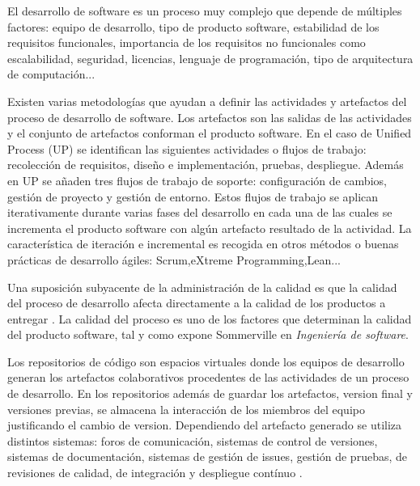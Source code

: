 

El desarrollo de software es un proceso muy complejo que depende de múltiples factores: equipo de desarrollo, tipo de producto software, estabilidad de los requisitos funcionales, importancia de los requisitos no funcionales como escalabilidad, seguridad, licencias, lenguaje de programación, tipo de arquitectura de computación...

Existen varias metodologías que ayudan a definir las actividades y artefactos del proceso de desarrollo de software. Los artefactos son las salidas de las actividades y el conjunto de artefactos conforman el producto software. En el caso de  Unified Process (UP) \cite{jacobson_proceso_2000} se identifican las siguientes actividades o flujos de trabajo: recolección de requisitos, diseño e implementación, pruebas, despliegue. Además en UP se añaden tres flujos de trabajo de soporte: configuración de cambios, gestión de proyecto y gestión de entorno. Estos flujos de trabajo se aplican iterativamente durante varias fases del desarrollo en cada una de las cuales se incrementa el producto software con algún artefacto resultado de la actividad. La característica de iteración e incremental es recogida en otros métodos o buenas prácticas de desarrollo ágiles\cite{noauthor_scrum_2019}: 
Scrum,eXtreme Programming,Lean...

Una suposición subyacente de la administración de la calidad es que la calidad del proceso de desarrollo afecta directamente a la calidad de los productos a entregar \citep[pág 543]{sommerville_ingenierisoftware_2002}.
La calidad del proceso es uno de los factores que determinan la calidad del producto software, tal y como expone Sommerville en \textit{Ingeniería de software}\cite{sommerville_ingenierisoftware_2002}.

Los repositorios de código son espacios virtuales donde los equipos de desarrollo generan los artefactos colaborativos procedentes de las actividades de un proceso de desarrollo. En los repositorios además de guardar los artefactos, version final y versiones previas, se almacena la interacción de los miembros del equipo justificando el cambio de version. Dependiendo del artefacto generado se utiliza distintos sistemas: foros de comunicación, sistemas de control de versiones, sistemas de documentación, sistemas de gestión de issues, gestión de pruebas, de revisiones de calidad, de  integración y despliegue contínuo \cite{guemes-pena_emerging_2018}.

